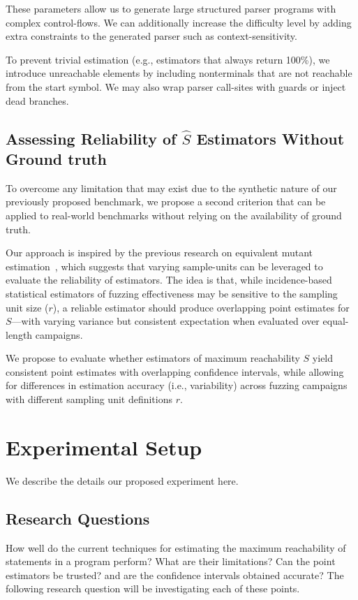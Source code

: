 \documentclass[conference,anonymous,review]{IEEEtran}
\begin{document}
These parameters allow us to generate large structured parser programs with
complex control-flows. We can additionally increase the difficulty level by
adding extra constraints to the generated parser such
as context-sensitivity.

To prevent trivial estimation (e.g., estimators that always return 100\%),
we introduce unreachable elements by including nonterminals that are not
reachable from the start symbol.
We may also wrap parser call-sites with guards or inject dead branches.

\subsection{Assessing Reliability of \texorpdfstring{$\hat{S}$}{S-hat} Estimators Without Ground truth}
To overcome any limitation that may exist due to the synthetic nature of our
previously proposed benchmark, we propose a second criterion that can be applied
to real-world benchmarks without relying on the availability of ground truth.

Our approach is inspired by the previous research on equivalent mutant
estimation~\cite{Kuznetsov2024empirical}, which suggests that varying
sample-units can be leveraged to evaluate the reliability of estimators.
The idea is that, while incidence-based statistical estimators of
fuzzing effectiveness may be sensitive to the sampling unit size ($r$),
a reliable estimator should produce overlapping point estimates for $S$—with
varying variance but consistent expectation when evaluated over equal-length
campaigns.

We propose to evaluate whether estimators of maximum reachability $S$ yield
consistent point estimates with overlapping confidence intervals, while allowing
for differences in estimation accuracy (i.e., variability) across fuzzing
campaigns with different sampling unit definitions $r$.

\section{Experimental Setup}
\label{sec:setup}
We describe the details our proposed experiment here.
\subsection{Research Questions}
How well do the current techniques for estimating the maximum reachability
of statements in a program perform? What are their limitations? Can the
point estimators be trusted? and are the confidence intervals obtained accurate?
The following research question will be investigating each of these points.
\end{document}
